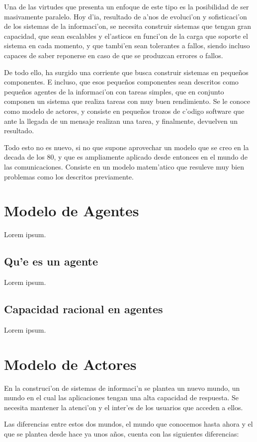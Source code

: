 \documentclass[12pt]{article}
\begin{document}
Una de las virtudes que presenta un enfoque de este tipo es la posibilidad de ser masivamente
paralelo. Hoy d'ia, resultado de a'nos de evoluci'on y sofisticaci'on de los sistemas de la informaci'on,
se necesita construir sistemas que tengan gran capacidad, que sean escalables y el'asticos
en funci'on de la carga que soporte el sistema en cada momento, y que tambi'en sean tolerantes
a fallos, siendo incluso capaces de saber reponerse en caso de que se produzcan errores o fallos.

De todo ello, ha surgido una corriente que busca construir sistemas en pequeños componentes. E incluso,
que esos pequeños componentes sean descritos como pequeños agentes de la informaci'on con tareas simples,
que en conjunto componen un sistema que realiza tareas con muy buen rendimiento. Se le conoce como modelo de
actores, y consiste en pequeños trozos de c'odigo software que ante la llegada de un mensaje realizan
una tarea, y finalmente, devuelven un resultado.

Todo esto no es nuevo, si no que supone aprovechar un modelo que se creo en la decada de los 80, y
que es ampliamente aplicado desde entonces en el mundo de las comunicaciones. Consiste en un
modelo matem'atico que resuleve muy bien problemas como los descritos previamente.

\section{Modelo de Agentes}
\label{sec:modelo de agentes}
Lorem ipsum.
\subsection{Qu'e es un agente}
\label{sub:que es un agente}
Lorem ipsum.
\subsection{Capacidad racional en agentes}
\label{sub:capacidad racional en agentes}
Lorem ipsum.
\section{Modelo de Actores}
\label{sec:modelos de actores}
En la construci'on de sistemas de informaci'n se plantea un nuevo mundo, un mundo en el cual
las aplicaciones tengan una alta capacidad de respuesta. Se necesita mantener la atenci'on y el
inter'es de los usuarios que acceden a ellos.

Las diferencias entre estos dos mundos, el mundo que conocemos hasta ahora y el que se plantea
desde hace ya unos años, cuenta con las siguientes diferencias:
\end{document}

